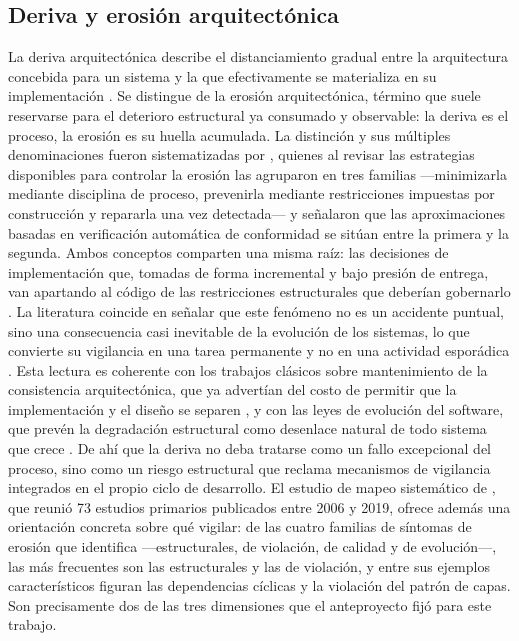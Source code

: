 \subsection{Deriva y erosión arquitectónica}
La deriva arquitectónica describe el distanciamiento gradual entre la arquitectura concebida para un sistema y la que efectivamente se materializa en su implementación \citep{PerryWolf1992, Li2022}. Se distingue de la erosión arquitectónica, término que suele reservarse para el deterioro estructural ya consumado y observable: la deriva es el proceso, la erosión es su huella acumulada. La distinción y sus múltiples denominaciones fueron sistematizadas por \citet{DeSilva2012}, quienes al revisar las estrategias disponibles para controlar la erosión las agruparon en tres familias —minimizarla mediante disciplina de proceso, prevenirla mediante restricciones impuestas por construcción y repararla una vez detectada— y señalaron que las aproximaciones basadas en verificación automática de conformidad se sitúan entre la primera y la segunda. Ambos conceptos comparten una misma raíz: las decisiones de implementación que, tomadas de forma incremental y bajo presión de entrega, van apartando al código de las restricciones estructurales que deberían gobernarlo \citep{Anthony2024}. La literatura coincide en señalar que este fenómeno no es un accidente puntual, sino una consecuencia casi inevitable de la evolución de los sistemas, lo que convierte su vigilancia en una tarea permanente y no en una actividad esporádica \citep{Klein2022}. Esta lectura es coherente con los trabajos clásicos sobre mantenimiento de la consistencia arquitectónica, que ya advertían del costo de permitir que la implementación y el diseño se separen \citep{Rosik}, y con las leyes de evolución del software, que prevén la degradación estructural como desenlace natural de todo sistema que crece \citep{Lehman1980}. De ahí que la deriva no deba tratarse como un fallo excepcional del proceso, sino como un riesgo estructural que reclama mecanismos de vigilancia integrados en el propio ciclo de desarrollo. El estudio de mapeo sistemático de \citet{Li2022}, que reunió 73 estudios primarios publicados entre 2006 y 2019, ofrece además una orientación concreta sobre qué vigilar: de las cuatro familias de síntomas de erosión que identifica ---estructurales, de violación, de calidad y de evolución---, las más frecuentes son las estructurales y las de violación, y entre sus ejemplos característicos figuran las dependencias cíclicas y la violación del patrón de capas. Son precisamente dos de las tres dimensiones que el anteproyecto fijó para este trabajo.

